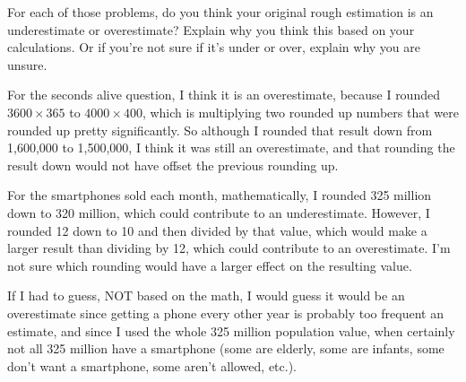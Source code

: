 \documentclass[12pt]{ximera}
\begin{document}
\begin{problem}
For each of those problems, do you think your original rough estimation is an
underestimate or overestimate? Explain why you think this based on your calculations.
Or if you're not sure if it's under or over, explain why you are unsure.

\begin{freeResponse}
\end{freeResponse}

\begin{solution}
For the seconds alive question, I think it is an overestimate, because I rounded
$3600 \times 365$ to $4000 \times 400$, which is multiplying two rounded up numbers that
were rounded up pretty significantly. So although I rounded that result down from
1,600,000 to 1,500,000, I think it was still an overestimate, and that rounding the
result down would not have offset the previous rounding up.

For the smartphones sold each month, mathematically, I rounded 325 million down to 320
million, which could contribute to an underestimate. However, I rounded 12 down to 10
and then divided by that value, which would make a larger result than dividing by 12,
which could contribute to an overestimate. I'm not sure which rounding would have a
larger effect on the resulting value.

If I had to guess, NOT based on the math, I would guess it would be an overestimate
since getting a phone every other year is probably too frequent an estimate, and since I
used the whole 325 million population value, when certainly not all 325 million have a
smartphone (some are elderly, some are infants, some don't want a smartphone, some
aren't allowed, etc.).
\end{solution}
\end{problem}
\end{document}
